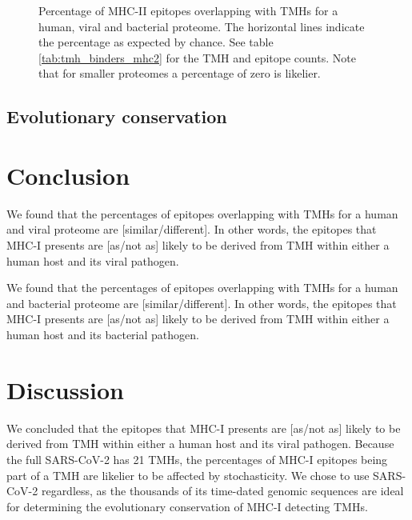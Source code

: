 \begin{figure}[!htbp]
  \caption{
    Percentage of MHC-II epitopes overlapping with TMHs
    for a human, viral and bacterial proteome.
    The horizontal lines indicate the percentage as expected by chance.
    See table \ref{tab:tmh_binders_mhc2} for the TMH and epitope counts.
    Note that for smaller proteomes a percentage of zero is likelier.
  }
  \label{fig:2}
\end{figure}

\subsection{Evolutionary conservation}


\section{Conclusion}

We found that the percentages of epitopes overlapping 
with TMHs for a human and viral proteome are 
[similar/different]. In other words, the
epitopes that MHC-I presents are [as/not as] likely 
to be derived from TMH within either a human host and its viral pathogen.

We found that the percentages of epitopes overlapping 
with TMHs for a human and bacterial proteome are 
[similar/different]. In other words, the
epitopes that MHC-I presents are [as/not as] likely 
to be derived from TMH within either a human host and its bacterial pathogen.

\section{Discussion}

We concluded that the
epitopes that MHC-I presents are [as/not as] likely 
to be derived from TMH within either a human host and its viral pathogen.
Because the full SARS-CoV-2 has 21 TMHs, the percentages
of MHC-I epitopes being part of a TMH are likelier to be affected by
stochasticity. We chose to use SARS-CoV-2 regardless, as the thousands
of its time-dated genomic sequences are ideal for determining the 
evolutionary conservation of MHC-I detecting TMHs. 

